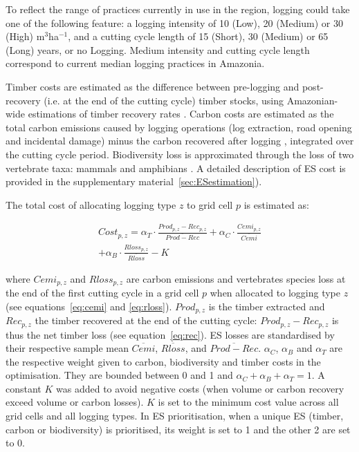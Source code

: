 \documentclass{article}
\begin{document}
To reflect the range of practices currently in use in the region, logging could take one of the following feature: a logging intensity of 10 (Low), 20 (Medium) or 30 (High) m$^3$ha$^{−1}$, and a cutting cycle length of 15 (Short), 30 (Medium) or 65 (Long) years, or no Logging. Medium intensity and cutting cycle length correspond to current median logging practices in Amazonia. 

Timber costs are estimated as the difference between pre-logging and post-recovery (i.e. at the end of the cutting cycle) timber stocks, using Amazonian-wide estimations of timber recovery rates \cite{Piponiotc}. 
Carbon costs are estimated as the total carbon emissions caused by logging operations (log extraction, road opening and incidental damage) minus the carbon recovered after logging \cite{Piponiot2016a}, integrated over the cutting cycle period. 
Biodiversity loss is approximated through the loss of two vertebrate taxa: mammals and amphibians \cite{Jenkins2013}. A detailed description of ES cost is provided in the supplementary material~\ref{sec:ESestimation}). 

The total cost of allocating logging type $z$ to grid cell $p$ is estimated as: 

\begin{equation}
\begin{split}
    Cost_{p,z} = \alpha _T \cdot \frac{Prod_{p,z} - Rec_{p,z}}{\overline{Prod - Rec}} + \alpha _C \cdot \frac{Cemi_{p,z}}{\overline{Cemi} } \\ + \alpha _B \cdot \frac{Rloss_{p,z}}{\overline{Rloss}} - K
\end{split}
\end{equation}

where $Cemi_{p,z}$ and $Rloss_{p,z}$ are carbon emissions and vertebrates species loss at the end of the first cutting cycle in a grid cell $p$ when allocated to logging type $z$ (see equations~\ref{eq:cemi} and \ref{eq:rloss}). $Prod_{p,z}$ is the timber extracted and $Rec_{p,z}$ the timber recovered at the end of the cutting cycle: $Prod_{p,z} - Rec_{p,z}$ is thus the net timber loss (see equation~\ref{eq:rec}). 
ES losses are standardised by their respective sample mean $\overline{Cemi}$, $\overline{Rloss}$, and $\overline{Prod-Rec}$. 
$\alpha_C$, $\alpha_B$ and $\alpha_T$ are the respective weight given to carbon, biodiversity and timber costs in the optimisation. They are bounded between 0 and 1 and $\alpha_C+\alpha_B+\alpha_T = 1$. 
A constant $K$ was added to avoid negative costs (when volume or carbon recovery exceed volume or carbon losses). $K$ is set to the minimum cost value across all grid cells and all logging types. 
In ES prioritisation, when a unique ES (timber, carbon or biodiversity) is prioritised, its weight is set to 1 and the other 2 are set to 0. 
\end{document}
